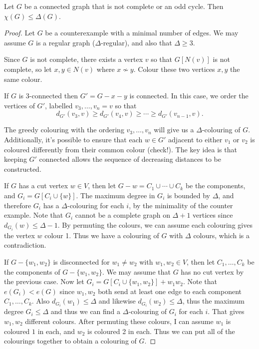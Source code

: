 \documentclass[a4paper]{scrartcl}
\begin{document}
\begin{theorem}
	Let $G$ be a connected graph that is not complete or an odd cycle. Then $\chi(G) \leq \Delta(G)$.
\end{theorem}
\begin{proof}
	Let $G$ be a counterexample with a minimal number of edges.
	We may assume $G$ is a regular graph ($\Delta$-regular), and also that $\Delta \geq 3$.

	Since $G$ is not complete, there exists a vertex $v$ so that $G[N(v)]$ is not complete, so let $x, y \in N(v)$ where $x \not \sim y$. Colour these two vertices $x,y$ the same colour. 

	If $G$ is 3-connected then $G' = G - x - y$ is connected. In this case, we order the vertices of $G'$, labelled $v_3, \dots , v_n = v$ so that
	$$
		d_{G'}(v_3, v) \geq d_{G'}(v_4, v) \geq \cdots \geq d_{G'}(v_{n - 1}, v).
	$$
	
	The greedy colouring with the ordering $v_3, \dots, v_n$ will give us a $\Delta$-colouring of $G$. Additionally, it's possible to ensure that each $w \in G'$ adjacent to either $v_1$ or $v_2$ is coloured differently from their common colour (check!). The key idea is that keeping $G'$ connected allows the sequence of decreasing distances to be constructed. 

	If $G$ has a cut vertex $w \in V$, then let $G- w = C_1 \cup \cdots \cup C_k$ be the components, and $G_i = G[C_i \cup \{w\}]$. The maximum degree in $G_i$ is bounded by $\Delta$, and therefore $G_i$ has a $\Delta$-colouring for each $i$, by the minimality of the counter example. 
	Note that $G_i$ cannot be a complete graph on $\Delta + 1$ vertices since $d_{G_i}(w) \leq \Delta - 1$.
	By permuting the colours, we can assume each colouring gives the vertex $w$ colour 1. Thus we have a colouring of $G$ with $\Delta$ colours, which is a contradiction.

	If $G-\{w_1, w_2\}$ is disconnected for $w_1 \neq w_2$ with $w_1, w_2 \in V$, then let $C_1, \dots, C_k$ be the components of $G - \{w_1, w_2\}$. We may assume that $G$ has no cut vertex by the previous case. Now let $G_i = G[C_i \cup \{w_1, w_2\}]+ w_1w_2$. Note that $e(G_i) < e(G)$ since $w_1, w_2$ both send at least one edge to each component $C_1, \dots, C_k$. Also $d_{G_i}(w_1) \leq \Delta$ and likewise $d_{G_i}(w_2) \leq \Delta$, thus the maximum degree $G_i \leq \Delta$ and thus we can find a $\Delta$-colouring of $G_i$ for each $i$. That gives $w_1, w_2$ different colours. After permuting these colours, I can assume $w_1$ is coloured $1$ in each, and $w_2$ is coloured 2 in each. Thus we can put all of the colourings together to obtain a colouring of $G$.
\end{proof}
\end{document}
